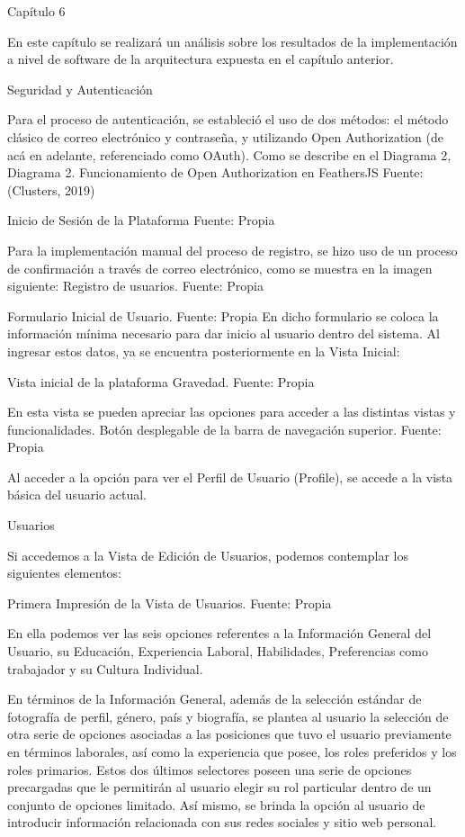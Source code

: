 Capítulo 6

En este capítulo se realizará un análisis sobre los resultados de la implementación a nivel de software de la arquitectura expuesta en el capítulo anterior.

Seguridad y Autenticación

Para el proceso de autenticación, se estableció el uso de dos métodos: el método clásico de correo electrónico y contraseña, y utilizando Open Authorization (de acá en adelante, referenciado como OAuth). Como se describe en el Diagrama 2,
Diagrama 2. Funcionamiento de Open Authorization en FeathersJS
Fuente: (Clusters, 2019)


Inicio de Sesión de la Plataforma
Fuente: Propia

Para la implementación manual del proceso de registro, se hizo uso de un proceso de confirmación a través de correo electrónico, como se muestra en la imagen siguiente:
Registro de usuarios. Fuente: Propia

Formulario Inicial de Usuario. Fuente: Propia
En dicho formulario se coloca la información mínima necesario para dar inicio al usuario dentro del sistema. Al ingresar estos datos, ya se encuentra posteriormente en la Vista Inicial:

Vista inicial de la plataforma Gravedad. Fuente: Propia

En esta vista se pueden apreciar las opciones para acceder a las distintas vistas y funcionalidades.
Botón desplegable de la barra de navegación superior.
Fuente: Propia

Al acceder a la opción para ver el Perfil de Usuario (Profile), se accede a la vista básica del usuario actual.

Usuarios

Si accedemos a la Vista de Edición de Usuarios, podemos contemplar los siguientes elementos:

Primera Impresión de la Vista de Usuarios. Fuente: Propia

En ella podemos ver las seis opciones referentes a la Información General del Usuario, su Educación, Experiencia Laboral, Habilidades, Preferencias como trabajador y su Cultura Individual.

En términos de la Información General, además de la selección estándar de fotografía de perfil, género, país y biografía, se plantea al usuario la selección de otra serie de opciones asociadas a las posiciones que tuvo el usuario previamente en términos laborales, así como la experiencia que posee, los roles preferidos y los roles primarios. Estos dos últimos selectores poseen una serie de opciones precargadas que le permitirán al usuario elegir su rol particular dentro de un conjunto de opciones limitado. Así mismo, se brinda la opción al usuario de introducir información relacionada con sus redes sociales y sitio web personal.

